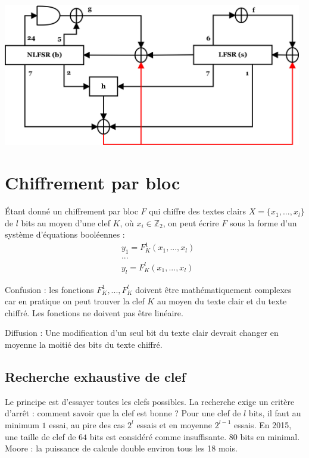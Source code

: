 \documentclass[11pt,a4paper]{report}
\begin{document}
\begin{center}
\includegraphics[width=0.98\textwidth]{img/Grain_init.png}
\end{center}

\section{Chiffrement par bloc}

Étant donné un chiffrement par bloc $F$ qui chiffre des textes clairs $X = \{x_1,...,x_l\}$ de $l$ bits au moyen d'une clef $K$, où $x_i \in \mathbb{Z}_2$, on peut écrire $F$ sous la forme d'un système d'équations booléennes :
\begin{align*}
&y_1 = F^1_K(x_1,...,x_l) \\
&... \\
&y_l = F^l_K(x_1,...,x_l)
\end{align*}

Confusion : les fonctions $F^1_K,...,F^l_K$ doivent être mathématiquement complexes car en pratique on peut trouver la clef $K$ au moyen du texte clair et du texte chiffré. Les fonctions ne doivent pas être linéaire.

Diffusion : Une modification d'un seul bit du texte clair devrait changer en moyenne la moitié des bits du texte chiffré.

\subsection{Recherche exhaustive de clef}

Le principe est d'essayer toutes les clefs possibles. La recherche exige un critère d'arrêt : comment savoir que la clef est bonne ? Pour une clef de $l$ bits, il faut au minimum $1$ essai, au pire des cas $2^l$ essais et en moyenne $2^{l-1}$ essais. En 2015, une taille de clef de $64$ bits est considéré comme insuffisante. $80$ bits en minimal. Moore : la puissance de calcule double environ tous les 18 mois.
\end{document}
